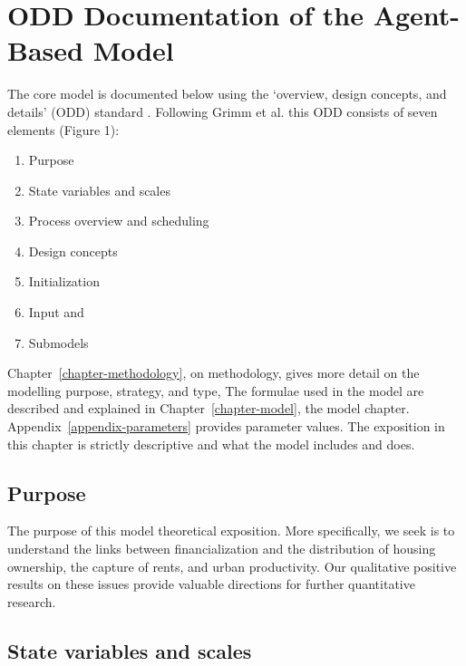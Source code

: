 \chapter{ODD Documentation of the Agent-Based Model} \label{appendix-odd}

The core model is documented below using the `overview, design concepts, and details' (ODD) standard \cite{grimmODDProtocolReview2010a}. Following Grimm et al. \cite{grimmODDProtocolDescribing2020} this ODD consists of seven elements (Figure 1):

\begin{enumerate}
    \item Purpose
    \item State variables and scales
    \item Process overview and scheduling 
    \item Design concepts
    \item Initialization
    \item Input and 
    \item Submodels 
\end{enumerate}

Chapter~\ref{chapter-methodology}, on methodology, gives more detail on the modelling purpose, strategy, and type, The formulae used in the model are described and explained in Chapter~\ref{chapter-model}, the model chapter. Appendix~\ref{appendix-parameters} provides parameter values.  The exposition in this chapter is strictly descriptive and what the model includes and does.

\section{Purpose}
The purpose of this model \gls{theoretical exposition}. More specifically, we seek is to understand the links between financialization and  the distribution of housing ownership, the capture of rents, and  urban productivity. %
Our  qualitative positive results on these issues provide valuable directions for further quantitative research.

\section{State variables and scales}
